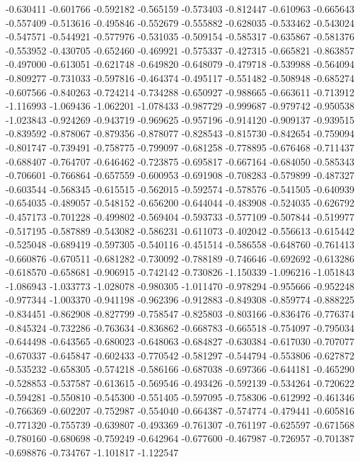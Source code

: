 -0.630411
-0.601766
-0.592182
-0.565159
-0.573403
-0.812447
-0.610963
-0.665643
-0.557409
-0.513616
-0.495846
-0.552679
-0.555882
-0.628035
-0.533462
-0.543024
-0.547571
-0.544921
-0.577976
-0.531035
-0.509154
-0.585317
-0.635867
-0.581376
-0.553952
-0.430705
-0.652460
-0.469921
-0.575337
-0.427315
-0.665821
-0.863857
-0.497000
-0.613051
-0.621748
-0.649820
-0.648079
-0.479718
-0.539988
-0.564094
-0.809277
-0.731033
-0.597816
-0.464374
-0.495117
-0.551482
-0.508948
-0.685274
-0.607566
-0.840263
-0.724214
-0.734288
-0.650927
-0.988665
-0.663611
-0.713912
-1.116993
-1.069436
-1.062201
-1.078433
-0.987729
-0.999687
-0.979742
-0.950538
-1.023843
-0.924269
-0.943719
-0.969625
-0.957196
-0.914120
-0.909137
-0.939515
-0.839592
-0.878067
-0.879356
-0.878077
-0.828543
-0.815730
-0.842654
-0.759094
-0.801747
-0.739491
-0.758775
-0.799097
-0.681258
-0.778895
-0.676468
-0.711437
-0.688407
-0.764707
-0.646462
-0.723875
-0.695817
-0.667164
-0.684050
-0.585343
-0.706601
-0.766864
-0.657559
-0.600953
-0.691908
-0.708283
-0.579899
-0.487327
-0.603544
-0.568345
-0.615515
-0.562015
-0.592574
-0.578576
-0.541505
-0.640939
-0.654035
-0.489057
-0.548152
-0.656200
-0.644044
-0.483908
-0.524035
-0.626792
-0.457173
-0.701228
-0.499802
-0.569404
-0.593733
-0.577109
-0.507844
-0.519977
-0.517195
-0.587889
-0.543082
-0.586231
-0.611073
-0.402042
-0.556613
-0.615442
-0.525048
-0.689419
-0.597305
-0.540116
-0.451514
-0.586558
-0.648760
-0.761413
-0.660876
-0.670511
-0.681282
-0.730092
-0.788189
-0.746646
-0.692692
-0.613286
-0.618570
-0.658681
-0.906915
-0.742142
-0.730826
-1.150339
-1.096216
-1.051843
-1.086943
-1.033773
-1.028078
-0.980305
-1.011470
-0.978294
-0.955666
-0.952248
-0.977344
-1.003370
-0.941198
-0.962396
-0.912883
-0.849308
-0.859774
-0.888225
-0.834451
-0.862908
-0.827799
-0.758547
-0.825803
-0.803166
-0.836476
-0.776374
-0.845324
-0.732286
-0.763634
-0.836862
-0.668783
-0.665518
-0.754097
-0.795034
-0.644498
-0.643565
-0.680023
-0.648063
-0.684827
-0.630384
-0.617030
-0.707077
-0.670337
-0.645847
-0.602433
-0.770542
-0.581297
-0.544794
-0.553806
-0.627872
-0.535232
-0.658305
-0.574218
-0.586166
-0.687038
-0.697366
-0.644181
-0.465290
-0.528853
-0.537587
-0.613615
-0.569546
-0.493426
-0.592139
-0.534264
-0.720622
-0.594281
-0.550810
-0.545300
-0.551405
-0.597095
-0.758306
-0.612992
-0.461346
-0.766369
-0.602207
-0.752987
-0.554040
-0.664387
-0.574774
-0.479441
-0.605816
-0.771320
-0.755739
-0.639807
-0.493369
-0.761307
-0.761197
-0.625597
-0.671568
-0.780160
-0.680698
-0.759249
-0.642964
-0.677600
-0.467987
-0.726957
-0.701387
-0.698876
-0.734767
-1.101817
-1.122547
